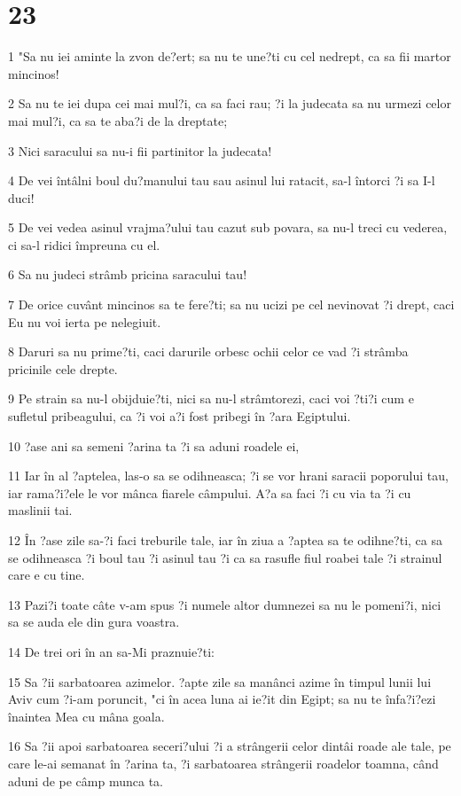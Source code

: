 \chapter{23}

\par 1 "Sa nu iei aminte la zvon de?ert; sa nu te une?ti cu cel nedrept, ca sa fii martor mincinos!
\par 2 Sa nu te iei dupa cei mai mul?i, ca sa faci rau; ?i la judecata sa nu urmezi celor mai mul?i, ca sa te aba?i de la dreptate;
\par 3 Nici saracului sa nu-i fii partinitor la judecata!
\par 4 De vei întâlni boul du?manului tau sau asinul lui ratacit, sa-l întorci ?i sa I-l duci!
\par 5 De vei vedea asinul vrajma?ului tau cazut sub povara, sa nu-l treci cu vederea, ci sa-l ridici împreuna cu el.
\par 6 Sa nu judeci strâmb pricina saracului tau!
\par 7 De orice cuvânt mincinos sa te fere?ti; sa nu ucizi pe cel nevinovat ?i drept, caci Eu nu voi ierta pe nelegiuit.
\par 8 Daruri sa nu prime?ti, caci darurile orbesc ochii celor ce vad ?i strâmba pricinile cele drepte.
\par 9 Pe strain sa nu-l obijduie?ti, nici sa nu-l strâmtorezi, caci voi ?ti?i cum e sufletul pribeagului, ca ?i voi a?i fost pribegi în ?ara Egiptului.
\par 10 ?ase ani sa semeni ?arina ta ?i sa aduni roadele ei,
\par 11 Iar în al ?aptelea, las-o sa se odihneasca; ?i se vor hrani saracii poporului tau, iar rama?i?ele le vor mânca fiarele câmpului. A?a sa faci ?i cu via ta ?i cu maslinii tai.
\par 12 În ?ase zile sa-?i faci treburile tale, iar în ziua a ?aptea sa te odihne?ti, ca sa se odihneasca ?i boul tau ?i asinul tau ?i ca sa rasufle fiul roabei tale ?i strainul care e cu tine.
\par 13 Pazi?i toate câte v-am spus ?i numele altor dumnezei sa nu le pomeni?i, nici sa se auda ele din gura voastra.
\par 14 De trei ori în an sa-Mi praznuie?ti:
\par 15 Sa ?ii sarbatoarea azimelor. ?apte zile sa manânci azime în timpul lunii lui Aviv cum ?i-am poruncit, "ci în acea luna ai ie?it din Egipt; sa nu te înfa?i?ezi înaintea Mea cu mâna goala.
\par 16 Sa ?ii apoi sarbatoarea seceri?ului ?i a strângerii celor dintâi roade ale tale, pe care le-ai semanat în ?arina ta, ?i sarbatoarea strângerii roadelor toamna, când aduni de pe câmp munca ta.
